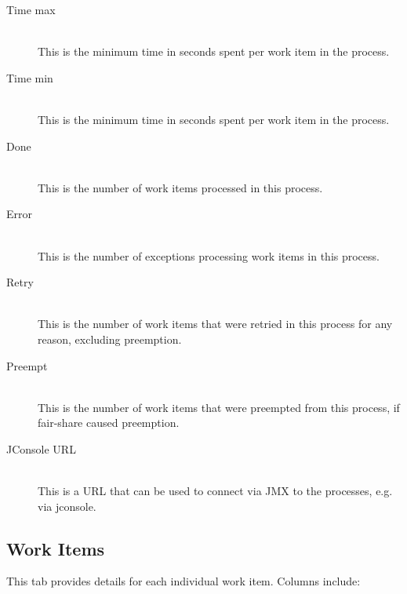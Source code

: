 \begin{description}
          \item[Time max] \hfill \\
            This is the minimum time in seconds spent per work item in the process.
            
          \item[Time min] \hfill \\
            This is the minimum time in seconds spent per work item in the process.
            
          \item[Done] \hfill \\
            This is the number of work items processed in this process.
            
          \item[Error] \hfill \\
            This is the number of exceptions processing work items in this process.
            
          \item[Retry] \hfill \\
            This is the number of work items that were retried in this process for any reason, excluding
            preemption.
            
          \item[Preempt] \hfill \\
            This is the number of work items that were preempted from this process, if
            fair-share caused preemption.
            
          \item[JConsole URL] \hfill \\
            This is a URL that can be used to connect via JMX to the processes, e.g. via
            jconsole.

      \end{description}

   \subsection{Work Items}
   \label{subsec:ws-work-items}
   This tab provides details for each individual work item.  Columns include:

